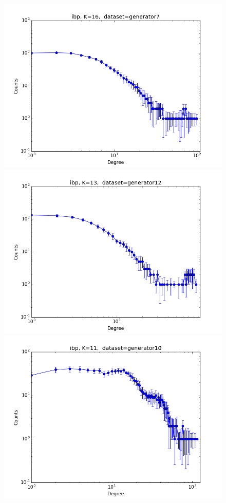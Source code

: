 \documentclass[a4paper, 12pt]{article}
\begin{document}
\begin{figure}[ht]
	\includegraphics[scale=0.27]{img/expe/1_ibp/figure_1}
	\endminipage
	\includegraphics[scale=0.27]{img/expe/2_ibp/figure_1}
	\endminipage
	\includegraphics[scale=0.27]{img/expe/3_ibp/figure_1}

\end{figure}
\end{document}
